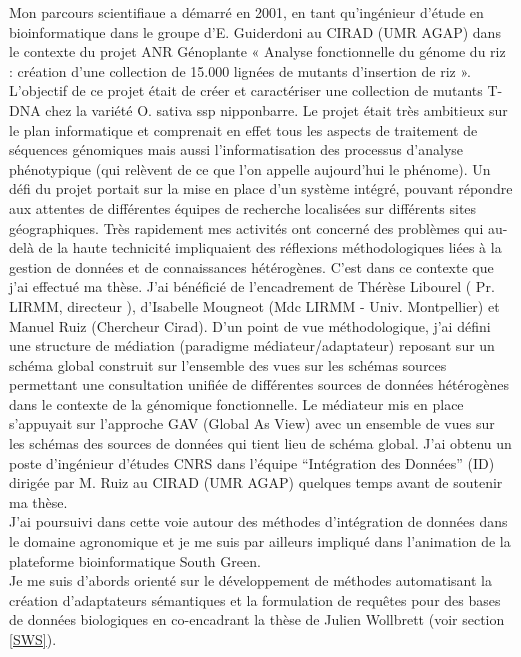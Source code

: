 Mon parcours scientifiaue a démarré en 2001, en tant qu’ingénieur d’étude en bioinformatique dans le groupe d’E. Guiderdoni au CIRAD (UMR AGAP) dans le contexte du projet ANR Génoplante « Analyse fonctionnelle du génome du riz : création d'une collection de 15.000 lignées de mutants d'insertion de riz ».  L'objectif de ce projet était de créer et caractériser une collection de mutants T-DNA chez la variété O. sativa ssp nipponbarre. Le projet était très ambitieux sur le plan informatique et comprenait en effet tous les aspects de traitement de séquences génomiques mais aussi l’informatisation des processus d’analyse phénotypique (qui relèvent de ce que l’on appelle aujourd’hui le phénome). Un défi du projet portait sur la mise en place d’un système intégré, pouvant répondre aux attentes de différentes  équipes de recherche localisées sur différents sites géographiques. Très rapidement mes activités ont concerné des problèmes qui au-delà de la haute technicité impliquaient des réflexions méthodologiques liées à la gestion de données et de connaissances hétérogènes. C’est dans ce contexte que j’ai effectué ma thèse. J’ai bénéficié de l’encadrement  de Thérèse Libourel ( Pr. LIRMM, directeur ), d’Isabelle Mougneot (Mdc LIRMM - Univ. Montpellier) et Manuel Ruiz (Chercheur Cirad). D’un point de vue méthodologique, j’ai défini une structure de médiation (paradigme médiateur/adaptateur) reposant sur un schéma global construit sur l'ensemble des vues sur les schémas sources permettant une consultation unifiée de différentes sources de données hétérogènes dans le contexte de la génomique fonctionnelle. Le médiateur mis en place s’appuyait sur l’approche GAV (Global As View) avec un ensemble de vues sur les schémas des sources de données qui tient lieu de schéma global. J’ai obtenu un poste d’ingénieur d’études CNRS dans l’équipe “Intégration des Données” (ID) dirigée par M. Ruiz au CIRAD (UMR AGAP) quelques temps avant de soutenir ma thèse. \\

J’ai poursuivi dans cette voie autour des méthodes d’intégration de données dans le domaine agronomique et je me suis par ailleurs impliqué dans l’animation de la plateforme bioinformatique South Green.  \\
Je me suis d’abords orienté sur le développement de méthodes automatisant la création d’adaptateurs sémantiques et la formulation de requêtes pour des bases de données biologiques en co-encadrant la thèse de Julien Wollbrett (voir section \ref{SWS}).\\

